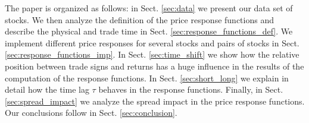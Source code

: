 The paper is organized as follows: in Sect. \ref{sec:data} we present our data
set of stocks. We then analyze the definition of the price response functions
and describe the physical and trade time in Sect.
\ref{sec:response_functions_def}. We implement different price responses for
several stocks and pairs of stocks in Sect. \ref{sec:response_functions_imp}.
In Sect. \ref{sec:time_shift} we show how the relative position between trade
signs and returns has a huge influence in the results of the computation of the
response functions. In Sect. \ref{sec:short_long} we explain in detail how the
time lag $\tau$ behaves in the response functions. Finally, in Sect.
\ref{sec:spread_impact} we analyze the spread impact in the price response
functions. Our conclusions follow in Sect. \ref{sec:conclusion}.